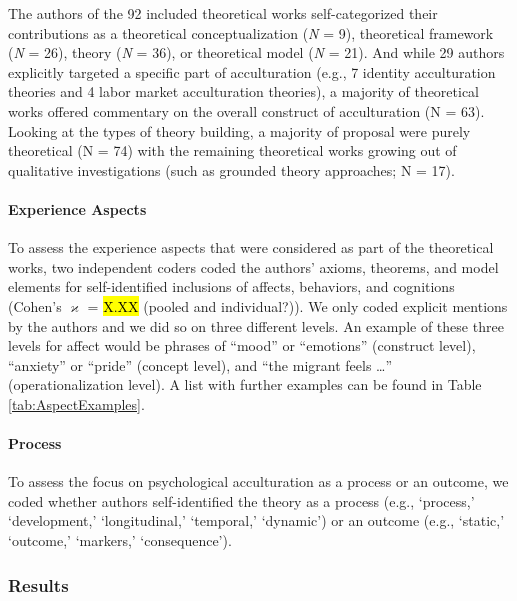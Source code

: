 The authors of the 92 included theoretical works self-categorized their
contributions as a theoretical conceptualization (\textit{N} = 9),
theoretical framework (\textit{N} = 26), theory (\textit{N} = 36), or
theoretical model (\textit{N} = 21). And while 29 authors explicitly
targeted a specific part of acculturation (e.g., 7 identity
acculturation theories and 4 labor market acculturation theories), a
majority of theoretical works offered commentary on the overall
construct of acculturation (N = 63). Looking at the types of theory
building, a majority of proposal were purely theoretical (N = 74) with
the remaining theoretical works growing out of qualitative
investigations (such as grounded theory approaches; N = 17).

\paragraph{Experience Aspects}

To assess the experience aspects that were considered as part of the
theoretical works, two independent coders coded the authors' axioms,
theorems, and model elements for self-identified inclusions of affects,
behaviors, and cognitions (Cohen's \(\varkappa\) = \hl{X.XX} (pooled and
individual?)). We only coded explicit mentions by the authors and we did
so on three different levels. An example of these three levels for
affect would be phrases of ``mood'' or ``emotions'' (construct level),
``anxiety'' or ``pride'' (concept level), and ``the migrant feels
\ldots{}'' (operationalization level). A list with further examples can
be found in Table \ref{tab:AspectExamples}.

\paragraph{Process}

To assess the focus on psychological acculturation as a process or an
outcome, we coded whether authors self-identified the theory as a
process (e.g., `process,' `development,' `longitudinal,' `temporal,'
`dynamic') or an outcome (e.g., `static,' `outcome,' `markers,'
`consequence').

\subsubsection{Results}

